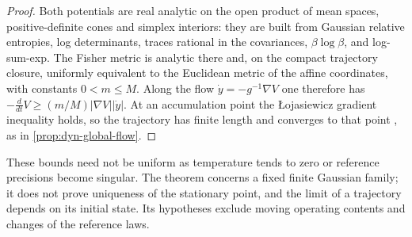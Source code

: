 \begin{proof}
Both potentials are real analytic on the open product of mean spaces, positive-definite cones and simplex interiors: they are built from Gaussian relative entropies, log determinants, traces rational in the covariances, $\beta\log\beta$, and log-sum-exp. The Fisher metric is analytic there and, on the compact trajectory closure, uniformly equivalent to the Euclidean metric of the affine coordinates, with constants $0<m\leq M$. Along the flow $\dot y=-g^{-1}\nabla V$ one therefore has $-\frac d{dt}V\geq(m/M)|\nabla V||\dot y|$. At an accumulation point the {\L}ojasiewicz gradient inequality holds, so the trajectory has finite length and converges to that point \citep{Lojasiewicz1963,AbsilMahonyAndrews2005}, as in \cref{prop:dyn-global-flow}.
\end{proof}

These bounds need not be uniform as temperature tends to zero or reference precisions become singular. The theorem concerns a fixed finite Gaussian family; it does not prove uniqueness of the stationary point, and the limit of a trajectory depends on its initial state. Its hypotheses exclude moving operating contents and changes of the reference laws.

